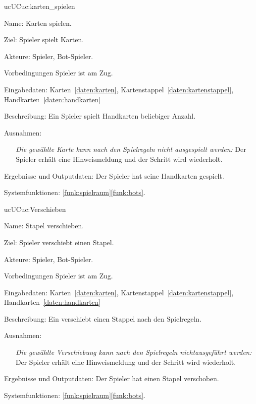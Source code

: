 \begin{description}[leftmargin=5em, style=sameline]
	\begin{lhp}{uc}{UC}{uc:karten_spielen}
		\item [Name:] Karten spielen.
		\item [Ziel:] Spieler spielt Karten.
		\item [Akteure:] Spieler, Bot-Spieler.
		\item [Vorbedingungen] Spieler ist am Zug.
		\item [Eingabedaten:] Karten~\ref{daten:karten}, Kartenstappel~\ref{daten:kartenstappel}, Handkarten~\ref{daten:handkarten}
		\item [Beschreibung:] Ein Spieler spielt Handkarten beliebiger Anzahl.
		\item [Ausnahmen:] \hfill
			\begin{itemize} 
				\item[] \textit{Die gewählte Karte kann nach den Spielregeln nicht ausgespielt werden:} Der Spieler erhält eine Hinweismeldung und der Schritt wird wiederholt.
			\end{itemize}
		\item [Ergebnisse und Outputdaten:] Der Spieler hat seine Handkarten gespielt.
		\item [Systemfunktionen:] \ref{funk:spielraum}\ref{funk:bots}.
	\end{lhp}
	
	\begin{lhp}{uc}{UC}{uc:Verschieben}
		\item [Name:] Stapel verschieben.
		\item [Ziel:] Spieler verschiebt einen Stapel.
		\item [Akteure:] Spieler, Bot-Spieler.
		\item [Vorbedingungen] Spieler ist am Zug.
		\item [Eingabedaten:] Karten~\ref{daten:karten}, Kartenstappel~\ref{daten:kartenstappel}, Handkarten~\ref{daten:handkarten}
		\item [Beschreibung:] Ein verschiebt einen Stappel nach den Spielregeln.
		\item [Ausnahmen:] \hfill
			\begin{itemize} 
				\item[] \textit{Die gewählte Verschiebung kann nach den Spielregeln nichtausgeführt werden:} Der Spieler erhält eine Hinweismeldung und der Schritt wird wiederholt.
			\end{itemize}
		\item [Ergebnisse und Outputdaten:] Der Spieler hat einen Stapel verschoben.
		\item [Systemfunktionen:] \ref{funk:spielraum}\ref{funk:bots}.
	\end{lhp}
	

\end{description}

